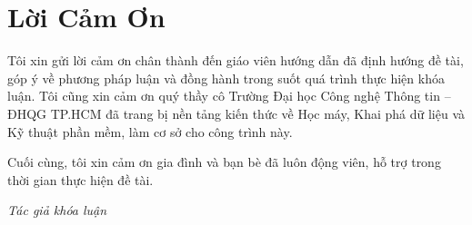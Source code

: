 \chapter*{Lời Cảm Ơn}

Tôi xin gửi lời cảm ơn chân thành đến giáo viên hướng dẫn đã định hướng đề tài, góp ý về phương pháp luận và đồng hành trong suốt quá trình thực hiện khóa luận. Tôi cũng xin cảm ơn quý thầy cô Trường Đại học Công nghệ Thông tin -- ĐHQG TP.HCM đã trang bị nền tảng kiến thức về Học máy, Khai phá dữ liệu và Kỹ thuật phần mềm, làm cơ sở cho công trình này.

Cuối cùng, tôi xin cảm ơn gia đình và bạn bè đã luôn động viên, hỗ trợ trong thời gian thực hiện đề tài.

\vspace{0.5cm}
\hfill\textit{Tác giả khóa luận}
